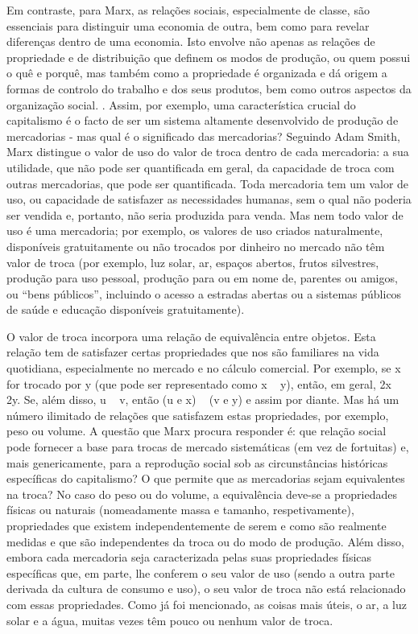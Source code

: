 Em contraste, para Marx, as relações sociais, especialmente de classe, são essenciais para distinguir uma economia de outra, bem como para revelar diferenças dentro de uma economia. Isto envolve não apenas as relações de propriedade e de distribuição que definem os modos de produção, ou quem possui o quê e porquê, mas também como a propriedade é organizada e dá origem a formas de controlo do trabalho e dos seus produtos, bem como outros aspectos da organização social. . Assim, por exemplo, uma característica crucial do capitalismo é o facto de ser um sistema altamente desenvolvido de produção de mercadorias - mas qual é o significado das mercadorias? Seguindo Adam Smith, Marx distingue o valor de uso do valor de troca dentro de cada mercadoria: a sua utilidade, que não pode ser quantificada em geral, da capacidade de troca com outras mercadorias, que pode ser quantificada. Toda mercadoria tem um valor de uso, ou capacidade de satisfazer as necessidades humanas, sem o qual não poderia ser vendida e, portanto, não seria produzida para venda. Mas nem todo valor de uso é uma mercadoria; por exemplo, os valores de uso criados naturalmente, disponíveis gratuitamente ou não trocados por dinheiro no mercado não têm valor de troca (por exemplo, luz solar, ar, espaços abertos, frutos silvestres, produção para uso pessoal, produção para ou em nome de, parentes ou amigos, ou “bens públicos”, incluindo o acesso a estradas abertas ou a sistemas públicos de saúde e educação disponíveis gratuitamente).
 \par 
O valor de troca incorpora uma relação de equivalência entre objetos. Esta relação tem de satisfazer certas propriedades que nos são familiares na vida quotidiana, especialmente no mercado e no cálculo comercial. Por exemplo, se x for trocado por y (que pode ser representado como x ~ y), então, em geral, 2x ~ 2y. Se, além disso, u ~ v, então (u e x) ~ (v e y) e assim por diante. Mas há um número ilimitado de relações que satisfazem estas propriedades, por exemplo, peso ou volume. A questão que Marx procura responder é: que relação social pode fornecer a base para trocas de mercado sistemáticas (em vez de fortuitas) e, mais genericamente, para a reprodução social sob as circunstâncias históricas específicas do capitalismo? O que permite que as mercadorias sejam equivalentes na troca? No caso do peso ou do volume, a equivalência deve-se a propriedades físicas ou naturais (nomeadamente massa e tamanho, respetivamente), propriedades que existem independentemente de serem e como são realmente medidas e que são independentes da troca ou do modo de produção. Além disso, embora cada mercadoria seja caracterizada pelas suas propriedades físicas específicas que, em parte, lhe conferem o seu valor de uso (sendo a outra parte derivada da cultura de consumo e uso), o seu valor de troca não está relacionado com essas propriedades. Como já foi mencionado, as coisas mais úteis, o ar, a luz solar e a água, muitas vezes têm pouco ou nenhum valor de troca.
